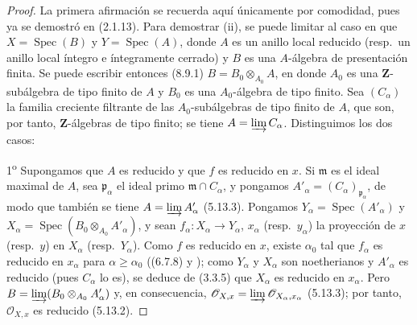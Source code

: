 \begin{proof}
La primera afirmación se recuerda aquí únicamente por comodidad, pues ya se demostró en (2.1.13). Para demostrar (ii), se puede limitar al caso en que $X=\operatorname{Spec}(B)$ y $Y=\operatorname{Spec}(A)$, donde $A$ es un anillo local reducido (resp.\ un anillo local íntegro e íntegramente cerrado) y $B$ es una $A$-álgebra de presentación finita. Se puede escribir entonces (8.9.1)
$B=B_0\otimes_{A_0}A$,
en donde $A_0$ es una $\mathbf Z$-subálgebra de tipo finito de $A$ y $B_0$ es una $A_0$-álgebra de tipo finito. Sea $(C_\alpha)$ la familia creciente filtrante de las $A_0$-subálgebras de tipo finito de $A$, que son, por tanto, $\mathbf Z$-álgebras de tipo finito; se tiene $A=\varinjlim C_\alpha$. Distinguimos los dos casos:

1\textsuperscript{o} Supongamos que $A$ es reducido y que $f$ es reducido en $x$. Si $\mathfrak m$ es el ideal maximal de $A$, sea $\mathfrak p_\alpha$ el ideal primo $\mathfrak m\cap C_\alpha$, y pongamos $A'_\alpha=(C_\alpha)_{\mathfrak p_\alpha}$, de modo que también se tiene $A=\varinjlim A'_\alpha$ (5.13.3). Pongamos $Y_\alpha=\operatorname{Spec}(A'_\alpha)$ y $X_\alpha=\operatorname{Spec}(B_0\otimes_{A_0}A'_\alpha)$, y sean $f_\alpha:X_\alpha\to Y_\alpha$, $x_\alpha$ (resp.\ $y_\alpha$) la proyección de $x$ (resp.\ $y$) en $X_\alpha$ (resp.\ $Y_\alpha$). Como $f$ es reducido en $x$, existe $\alpha_0$ tal que $f_\alpha$ es reducido en $x_\alpha$ para $\alpha\geq\alpha_0$ ((6.7.8) y ); como $Y_\alpha$ y $X_\alpha$ son noetherianos y $A'_\alpha$ es reducido (pues $C_\alpha$ lo es), se deduce de (3.3.5) que $X_\alpha$ es reducido en $x_\alpha$. Pero
$B=\varinjlim(B_0\otimes_{A_0}A'_\alpha)$
y, en consecuencia, $\mathcal O_{X,x}=\varinjlim\mathcal O_{X_\alpha,x_\alpha}$ (5.13.3); por tanto, $\mathcal O_{X,x}$ es reducido (5.13.2).


\end{proof}
